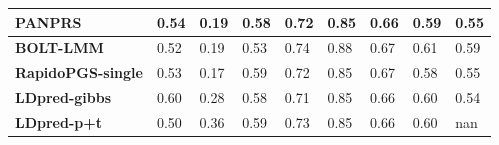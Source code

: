 \documentclass[pdflatex,sn-nature]{sn-jnl}%
\begin{document}
\begin{table}[!ht]
{\begin{tabular}{|l|l|l|l|l|l|l|l|l|}
\textbf{PANPRS}  \cite{Chen_2020}            & \cellcolor[HTML]{E3E383}0.54 & \cellcolor[HTML]{FDD37F}0.19 & \cellcolor[HTML]{FDD47F}0.58 & \cellcolor[HTML]{C5DB81}0.72                                                     & \cellcolor[HTML]{FEE683}0.85                                         & \cellcolor[HTML]{7FC67D}0.66                                                 & \cellcolor[HTML]{FEE382}0.59                                                    & \cellcolor[HTML]{DEE283}0.55 \\ \hline
\textbf{BOLT-LMM}    \cite{Loh_2015}        & \cellcolor[HTML]{FDD07E}0.52 & \cellcolor[HTML]{FDD47F}0.19 & \cellcolor[HTML]{F8696B}0.53 & \cellcolor[HTML]{63BE7B}0.74                                                     & \cellcolor[HTML]{D0DE82}0.88                                         & \cellcolor[HTML]{74C37C}0.67                                                 & \cellcolor[HTML]{E2E383}0.61                                                    & \cellcolor[HTML]{8ACA7E}0.59 \\ \hline
\textbf{RapidoPGS-single}  \cite{Reales_2021}  & \cellcolor[HTML]{FED880}0.53 & \cellcolor[HTML]{FDC87D}0.17 & \cellcolor[HTML]{FEEA83}0.59 & \cellcolor[HTML]{C4DA81}0.72                                                     & \cellcolor[HTML]{FEE683}0.85                                         & \cellcolor[HTML]{63BE7B}0.67                                                 & \cellcolor[HTML]{F98670}0.58                                                    & \cellcolor[HTML]{F3E884}0.55 \\ \hline
\textbf{LDpred-gibbs}   \cite{Reales_2021}     & \cellcolor[HTML]{63BE7B}0.60 & \cellcolor[HTML]{D1DE82}0.28 & \cellcolor[HTML]{FDD780}0.58 & \cellcolor[HTML]{E2E383}0.71                                                     & \cellcolor[HTML]{FEE683}0.85                                         & \cellcolor[HTML]{84C87D}0.66                                                 & \cellcolor[HTML]{F8E984}0.60                                                    & \cellcolor[HTML]{FEE783}0.54 \\ \hline
\textbf{LDpred-p+t}    \cite{Reales_2021}      & \cellcolor[HTML]{F98871}0.50 & \cellcolor[HTML]{85C87D}0.36 & \cellcolor[HTML]{FFEB84}0.59 & \cellcolor[HTML]{97CD7E}0.73                                                     & \cellcolor[HTML]{FEE683}0.85                                         & \cellcolor[HTML]{7CC67D}0.66                                                 & \cellcolor[HTML]{EEE683}0.60                                                    & nan                          \\ \hline

\end{tabular}}
\end{table}
\end{document}
